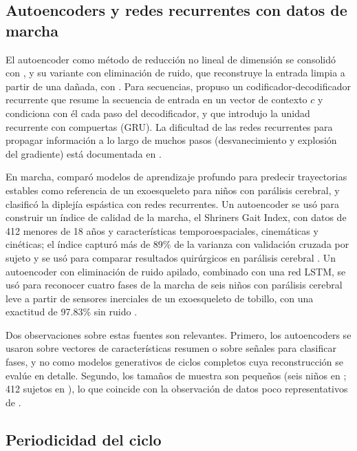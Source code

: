 \documentclass[11pt,a4paper]{article}
\begin{document}
\subsection{Autoencoders y redes recurrentes con datos de marcha}

El autoencoder como método de reducción no lineal de dimensión se consolidó con \cite{hinton2006}, y su variante con eliminación de ruido, que reconstruye la entrada limpia a partir de una dañada, con \cite{vincent2008}. Para secuencias, \cite{cho2014} propuso un codificador-decodificador recurrente que resume la secuencia de entrada en un vector de contexto $c$ y condiciona con él cada paso del decodificador, y que introdujo la unidad recurrente con compuertas (GRU). La dificultad de las redes recurrentes para propagar información a lo largo de muchos pasos (desvanecimiento y explosión del gradiente) está documentada en \cite{pascanu2013}.

En marcha, \cite{kolaghassi2023} comparó modelos de aprendizaje profundo para predecir trayectorias estables como referencia de un exoesqueleto para niños con parálisis cerebral, y \cite{ferrari2019} clasificó la diplejía espástica con redes recurrentes. Un autoencoder se usó para construir un índice de calidad de la marcha, el Shriners Gait Index, con datos de 412 menores de 18 años y características temporoespaciales, cinemáticas y cinéticas; el índice capturó más de 89\% de la varianza con validación cruzada por sujeto y se usó para comparar resultados quirúrgicos en parálisis cerebral \cite{wang2024}. Un autoencoder con eliminación de ruido apilado, combinado con una red LSTM, se usó para reconocer cuatro fases de la marcha de seis niños con parálisis cerebral leve a partir de sensores inerciales de un exoesqueleto de tobillo, con una exactitud de 97.83\% sin ruido \cite{pang2025}.

Dos observaciones sobre estas fuentes son relevantes. Primero, los autoencoders se usaron sobre vectores de características resumen o sobre señales para clasificar fases, y no como modelos generativos de ciclos completos cuya reconstrucción se evalúe en detalle. Segundo, los tamaños de muestra son pequeños (seis niños en \cite{pang2025}; 412 sujetos en \cite{wang2024}), lo que coincide con la observación de datos poco representativos de \cite{samadi2024}.

\subsection{Periodicidad del ciclo}
\end{document}
